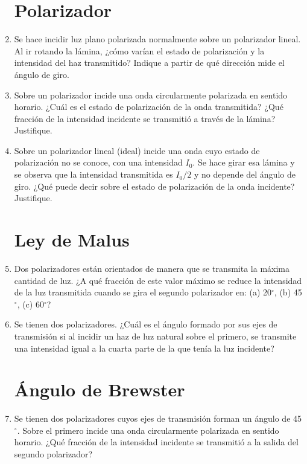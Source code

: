 \documentclass[11pt,spanish,a4paper]{article}
\begin{document}
\begin{enumerate}
\section*{Polarizador}

\item Se hace incidir luz plano polarizada normalmente sobre un polarizador
lineal. Al ir rotando la lámina, ¿cómo varían el estado de polarización
y la intensidad del haz transmitido? Indique a partir de qué dirección
mide el ángulo de giro.


\item Sobre un polarizador incide una onda circularmente polarizada en sentido
horario. ¿Cuál es el estado de polarización de la onda transmitida?
¿Qué fracción de la intensidad incidente se transmitió a través de
la lámina? Justifique.


\item Sobre un polarizador lineal (ideal) incide una onda cuyo estado de
polarización no se conoce, con una intensidad $I_{0}$. Se hace girar
esa lámina y se observa que la intensidad transmitida es $I_{0}/2$
y no depende del ángulo de giro. ¿Qué puede decir sobre el estado
de polarización de la onda incidente? Justifique.


\section*{Ley de Malus}
\item Dos polarizadores están orientados de manera que se transmita la máxima
cantidad de luz. ¿A qué fracción de este valor máximo se reduce la
intensidad de la luz transmitida cuando se gira el segundo polarizador
en: (a) 20$^{\circ}$, (b) 45$^{\circ}$, (c) 60$^{\circ}$?


\item Se tienen dos polarizadores. ¿Cuál es el ángulo formado por sus ejes
de transmisión si al incidir un haz de luz natural sobre el primero,
se transmite una intensidad igual a la cuarta parte de la que tenía
la luz incidente?


\section*{Ángulo de Brewster}
\item Se tienen dos polarizadores cuyos ejes de transmisión forman un ángulo
de 45$^{\circ}$. Sobre el primero incide una onda circularmente polarizada
en sentido horario. ¿Qué fracción de la intensidad incidente se transmitió
a la salida del segundo polarizador?



\end{enumerate}
\end{document}
